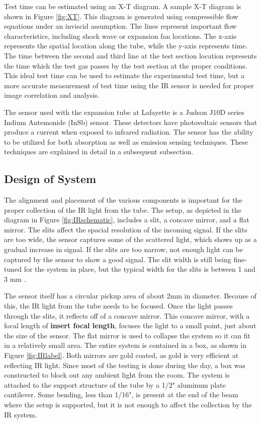 Test time can be estimated using an X-T diagram. A sample X-T diagram is shown in Figure \ref{fig:XT}. This diagram is generated using compressible flow equations under an inviscid assumption. The lines represent important flow characteristics, including shock wave or expansion fan locations. The x-axis represents the spatial location along the tube, while the y-axis represents time. The time between the second and third line at the test section location represents the time which the test gas passes by the test section at the proper conditions. This ideal test time can be used to estimate the experimental test time, but a more accurate measurement of test time using the IR sensor is needed for proper image correlation and analysis.

The sensor used with the expansion tube at Lafayette is a Judson J10D series Indium Antemonide (InSb) sensor. These detectors have photovoltaic sensors that produce a current when exposed to infrared radiation. The sensor has the ability to be utilized for both absorption as well as emission sensing techniques. These techniques are explained in detail in a subsequent subsection.


\subsection{Design of System}
The alignment and placement of the various components is important for the proper collection of the IR light from the tube. The setup, as depicted in the diagram in Figure \ref{fig:IRschematic}, includes a slit, a concave mirror, and a flat mirror. The slits affect the spacial resolution of the incoming signal. If the slits are too wide, the sensor captures some of the scattered light, which shows up as a gradual increase in signal. If the slits are too narrow, not enough light can be captured by the sensor to show a good signal. The slit width is still being fine-tuned for the system in place, but the typical width for the slits is between 1 and 3 mm \cite{flower1976experimental}. 

The sensor itself has a circular pickup area of about 2mm in diameter. Because of this, the IR light from the tube needs to be focused. Once the light passes through the slits, it reflects off of a concave mirror. This concave mirror, with a focal length of \textbf{insert focal length}, focuses the light to a small point, just about the size of the sensor. The flat mirror is used to collapse the system so it can fit in a relatively small area. The entire system is contained in a box, as shown in Figure \ref{fig:IRlabel}. Both mirrors are gold coated, as gold is very efficient at reflecting IR light. Since most of the testing is done during the day, a box was constructed to block out any ambient light from the room. The system is attached to the support structure of the tube by a 1/2" aluminum plate cantilever. Some bending, less than 1/16",  is present at the end of the beam where the setup is supported, but it is not enough to affect the collection by the IR system. 

